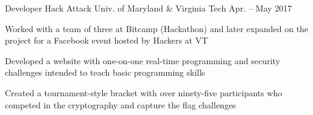 

\begin{cventries}

  \cventry
    {Developer} %
    {Hack Attack} %
    {Univ. of Maryland \& Virginia Tech} %
    {Apr. – May 2017} %
    {
      \begin{cvitems} %
      \item {Worked with a team of three at Bitcamp (Hackathon) and later expanded on the project for a Facebook event hosted by Hackers at VT}
      \item {Developed a website with one-on-one real-time programming and security challenges intended to teach basic programming skills}
      \item {Created a tournament-style bracket with over ninety-five participants who competed in the cryptography and capture the flag challenges}
      \end{cvitems}
    }

\end{cventries}
